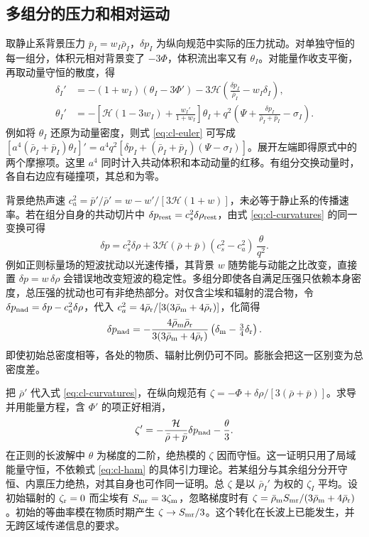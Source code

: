 \subsection{多组分的压力和相对运动}

取静止系背景压力 $\bar p_I=w_I\bar\rho_I$，$\delta p_I$ 为纵向规范中实际的压力扰动。对单独守恒的每一组分，体积元相对背景变了 $-3\Phi$，体积流出率又有 $\theta_I$。对能量作收支平衡，再取动量守恒的散度，得
\begin{align}
 \delta_I'&=-(1+w_I)(\theta_I-3\Phi')
 -3\mathcal H\left(\frac{\delta p_I}{\bar\rho_I}-w_I\delta_I\right),
 \label{eq:cl-energy}\\
 \theta_I'&=-\left[\mathcal H(1-3w_I)+\frac{w_I'}{1+w_I}\right]\theta_I
 +q^2\left(\Psi+\frac{\delta p_I}{\bar\rho_I+\bar p_I}-\sigma_I\right).
 \label{eq:cl-euler}
\end{align}
例如将 $\theta_I$ 还原为动量密度，则式 \eqref{eq:cl-euler} 可写成 $[a^4(\bar\rho_I+\bar p_I)\theta_I]'=a^4q^2[\delta p_I+(\bar\rho_I+\bar p_I)(\Psi-\sigma_I)]$。展开左端即得原式中的两个摩擦项。这里 $a^4$ 同时计入共动体积和本动动量的红移。有组分交换动量时，各自右边应有碰撞项，其总和为零。

背景绝热声速 $c_a^2=\bar p'/\bar\rho'=w-w'/[3\mathcal H(1+w)]$，未必等于静止系的传播速率。若在组分自身的共动切片中 $\delta p_{\rm rest}=c_s^2\delta\rho_{\rm rest}$，由式 \eqref{eq:cl-curvatures} 的同一变换可得
\[
 \delta p=c_s^2\delta\rho+
  3\mathcal H(\bar\rho+\bar p)(c_s^2-c_a^2)\,\frac{\theta}{q^2}.
\]
例如正则标量场的短波扰动以光速传播，其背景 $w$ 随势能与动能之比改变，直接置 $\delta p=w\,\delta\rho$ 会错误地改变短波的稳定性。多组分即使各自满足压强只依赖本身密度，总压强的扰动也可有非绝热部分。对仅含尘埃和辐射的混合物，令 $\delta p_{\rm nad}=\delta p-c_a^2\delta\rho$，代入 $c_a^2=4\bar\rho_{\rm r}/[3(3\bar\rho_{\rm m}+4\bar\rho_{\rm r})]$，化简得
\[
 \delta p_{\rm nad}
 =-\frac{4\bar\rho_{\rm m}\bar\rho_{\rm r}}
          {3(3\bar\rho_{\rm m}+4\bar\rho_{\rm r})}
          \left(\delta_{\rm m}-\tfrac34\delta_{\rm r}\right).
\]
即使初始总密度相等，各处的物质、辐射比例仍可不同。膨胀会把这一区别变为总密度差。

把 $\bar\rho'$ 代入式 \eqref{eq:cl-curvatures}，在纵向规范有 $\zeta=-\Phi+\delta\rho/[3(\bar\rho+\bar p)]$。求导并用能量方程，含 $\Phi'$ 的项正好相消，
\begin{equation}\label{eq:cl-zeta-conserve}
 \zeta'=-\frac{\mathcal H}{\bar\rho+\bar p}\delta p_{\rm nad}
         -\frac{\theta}{3}.
\end{equation}
在正则的长波解中 $\theta$ 为梯度的二阶，绝热模的 $\zeta$ 因而守恒。这一证明只用了局域能量守恒，不依赖式 \eqref{eq:cl-ham} 的具体引力理论。若某组分与其余组分分开守恒、内禀压力绝热，对其自身也可作同一证明。总 $\zeta$ 是以 $\bar\rho_I'$ 为权的 $\zeta_I$ 平均。设初始辐射的 $\zeta_{\rm r}=0$ 而尘埃有 $S_{\rm mr}=3\zeta_{\rm m}$，忽略梯度时有 $\zeta=\bar\rho_{\rm m} S_{\rm mr}/(3\bar\rho_{\rm m}+4\bar\rho_{\rm r})$。初始的等曲率模在物质时期产生 $\zeta\to S_{\rm mr}/3$。这个转化在长波上已能发生，并无跨区域传递信息的要求。

